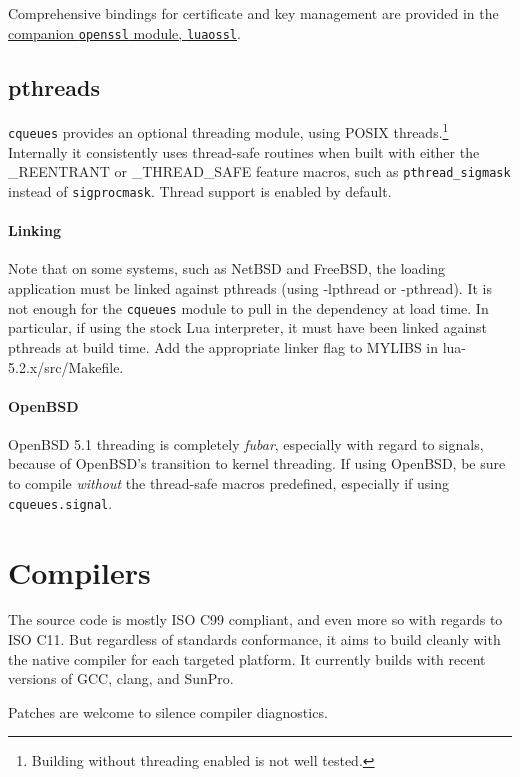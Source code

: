 \documentclass[11pt, oneside]{memoir}
\newcommand*{\cqueues}[0]{\texttt{cqueues}\xspace}
\newcommand*{\syscall}[1]{\texttt{#1}\xspace}
\newcommand*{\module}[1]{\texttt{#1}\xspace}
\begin{document}
Comprehensive bindings for certificate and key management are provided in the \href{http://25thandClement.com/~william/projects/luaossl.html}{companion \module{openssl} module, \texttt{luaossl}}.

\subsection{pthreads}

\cqueues provides an optional threading module, using POSIX threads.\footnote{Building without threading enabled is not well tested.} Internally it consistently uses thread-safe routines when built with either the \_REENTRANT or \_THREAD\_SAFE feature macros, such as \syscall{pthread\_sigmask} instead of \syscall{sigprocmask}. Thread support is enabled by default.

\paragraph{Linking}
Note that on some systems, such as NetBSD and FreeBSD, the loading application must be linked against pthreads (using -lpthread or -pthread). It is not enough for the \cqueues module to pull in the dependency at load time. In particular, if using the stock Lua interpreter, it must have been linked against pthreads at build time. Add the appropriate linker flag to MYLIBS in lua-5.2.x/src/Makefile.

\paragraph{OpenBSD}
OpenBSD 5.1 threading is completely \emph{fubar}, especially with regard to signals, because of OpenBSD's transition to kernel threading. If using OpenBSD, be sure to compile \emph{without} the thread-safe macros predefined, especially if using \module{cqueues.signal}.

\section{Compilers}

The source code is mostly ISO C99 compliant, and even more so with regards to ISO C11. But regardless of standards conformance, it aims to build cleanly with the native compiler for each targeted platform. It currently builds with recent versions of GCC, clang, and SunPro.

Patches are welcome to silence compiler diagnostics.
\end{document}
